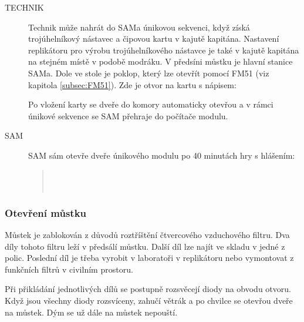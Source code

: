\documentclass[11pt,oneside,a4paper]{article}
\begin{document}
\begin{description}
\item[TECHNIK] Technik může nahrát do SAMa únikovou sekvenci, když získá trojúhelníkový nástavec a čipovou kartu v kajutě kapitána. Nastavení replikátoru pro výrobu trojúhelníkového nástavce je také v kajutě kapitána na stejném místě v podobě modráku. V předsíni můstku je hlavní stanice SAMa. Dole ve stole je poklop, který lze otevřít pomocí FM51 (viz kapitola \ref{subsec:FM51}). Zde je otvor na kartu s nápisem:
\begin{quote}
\end{quote}
Po vložení karty se dveře do komory automaticky otevřou a v rámci únikové sekvence se SAM přehraje do počítače modulu.
\item[SAM] SAM sám otevře dveře únikového modulu po 40 minutách hry s hlášením:
\begin{quote}
 \\
 \\
\end{quote}
\end{description}

\subsubsection{\texorpdfstring{Otevření můstku}{Otevreni mustku}}
\label{subsubsec:otevreni_mustku}
Můstek je zablokován z důvodů roztříštění čtvercového vzduchového filtru. Dva díly tohoto filtru leží v předsálí můstku. Další díl lze najít ve skladu v jedné z polic. Poslední díl je třeba vyrobit v laboratoři v replikátoru nebo vymontovat z funkčních filtrů v civilním prostoru.

Při přikládání jednotlivých dílů se postupně rozsvěcejí diody na obvodu otvoru. Když jsou všechny diody rozsvíceny, zahučí větrák a po chvilce se otevřou dveře na můstek. Dým se už dále na můstek nepouští.
\end{document}
